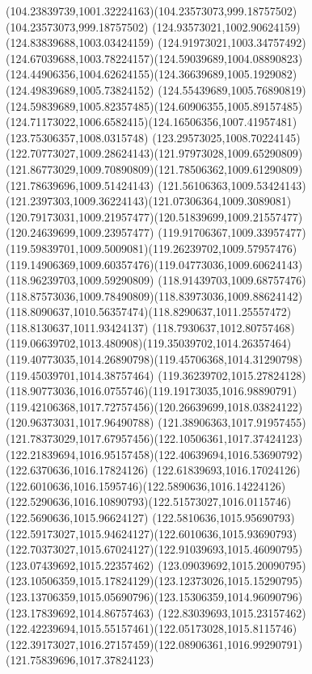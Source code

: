 {{  \curveto(104.23839739,1001.32224163)(104.23573073,999.18757502)(104.23573073,999.18757502)
  \lineto(124.93573021,1002.90624159)
  \lineto(124.83839688,1003.03424159)
  \curveto(124.91973021,1003.34757492)(124.67039688,1003.78224157)(124.59039689,1004.08890823)
  \curveto(124.44906356,1004.62624155)(124.36639689,1005.1929082)(124.49839689,1005.73824152)
  \curveto(124.55439689,1005.76890819)(124.59839689,1005.82357485)(124.60906355,1005.89157485)
  \curveto(124.71173022,1006.6582415)(124.16506356,1007.41957481)(123.75306357,1008.0315748)
  \curveto(123.29573025,1008.70224145)(122.70773027,1009.28624143)(121.97973028,1009.65290809)
  \curveto(121.86773029,1009.70890809)(121.78506362,1009.61290809)(121.78639696,1009.51424143)
  \curveto(121.56106363,1009.53424143)(121.2397303,1009.36224143)(121.07306364,1009.3089081)
  \curveto(120.79173031,1009.21957477)(120.51839699,1009.21557477)(120.24639699,1009.23957477)
  \curveto(119.91706367,1009.33957477)(119.59839701,1009.5009081)(119.26239702,1009.57957476)
  \curveto(119.14906369,1009.60357476)(119.04773036,1009.60624143)(118.96239703,1009.59290809)
  \curveto(118.91439703,1009.68757476)(118.87573036,1009.78490809)(118.83973036,1009.88624142)
  \curveto(118.8090637,1010.56357474)(118.8290637,1011.25557472)(118.8130637,1011.93424137)
  \curveto(118.7930637,1012.80757468)(119.06639702,1013.480908)(119.35039702,1014.26357464)
  \curveto(119.40773035,1014.26890798)(119.45706368,1014.31290798)(119.45039701,1014.38757464)
  \curveto(119.36239702,1015.27824128)(118.90773036,1016.0755746)(119.19173035,1016.98890791)
  \curveto(119.42106368,1017.72757456)(120.26639699,1018.03824122)(120.96373031,1017.96490788)
  \curveto(121.38906363,1017.91957455)(121.78373029,1017.67957456)(122.10506361,1017.37424123)
  \curveto(122.21839694,1016.95157458)(122.40639694,1016.53690792)(122.6370636,1016.17824126)
  \curveto(122.61839693,1016.17024126)(122.6010636,1016.1595746)(122.5890636,1016.14224126)
  \curveto(122.5290636,1016.10890793)(122.51573027,1016.0115746)(122.5690636,1015.96624127)
  \curveto(122.5810636,1015.95690793)(122.59173027,1015.94624127)(122.6010636,1015.93690793)
  \curveto(122.70373027,1015.67024127)(122.91039693,1015.46090795)(123.07439692,1015.22357462)
  \curveto(123.09039692,1015.20090795)(123.10506359,1015.17824129)(123.12373026,1015.15290795)
  \curveto(123.13706359,1015.05690796)(123.15306359,1014.96090796)(123.17839692,1014.86757463)
  \curveto(122.83039693,1015.23157462)(122.42239694,1015.55157461)(122.05173028,1015.8115746)
  \curveto(122.39173027,1016.27157459)(122.08906361,1016.99290791)(121.75839696,1017.37824123)
}}
